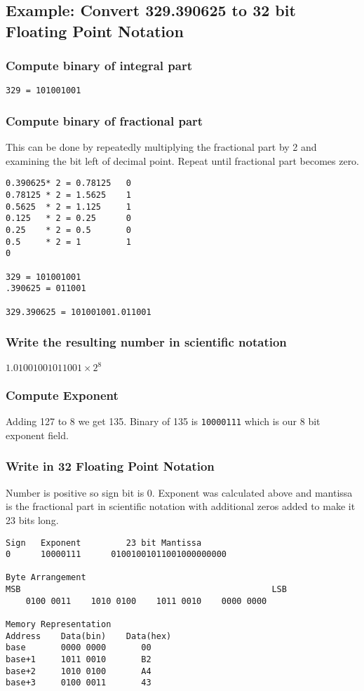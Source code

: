 \documentclass[12pt,a4paper]{article}
\begin{document}
\subsection{Example: Convert 329.390625 to 32 bit Floating Point Notation}
\subsubsection{Compute binary of integral part}
\verb|329 = 101001001|
\subsubsection{Compute binary of fractional part}
This can be done by repeatedly multiplying the fractional part by 2 and examining the bit left of decimal point. Repeat until fractional part becomes zero.
\begin{verbatim}
0.390625* 2 = 0.78125   0
0.78125 * 2 = 1.5625    1
0.5625  * 2 = 1.125     1
0.125   * 2 = 0.25      0
0.25    * 2 = 0.5       0
0.5     * 2 = 1         1
0

329 = 101001001
.390625 = 011001

329.390625 = 101001001.011001
\end{verbatim}
\subsubsection{Write the resulting number in scientific notation}
$1.01001001011001 \times 2^8$
\subsubsection{Compute Exponent}
Adding 127 to 8 we get 135. Binary of 135 is \verb|10000111| which is our 8 bit exponent field.
\subsubsection{Write in 32 Floating Point Notation}
Number is positive so sign bit is 0. Exponent was calculated above and mantissa is the fractional part in scientific notation with additional zeros added to make it 23 bits long.
\begin{verbatim}
Sign   Exponent         23 bit Mantissa
0      10000111      01001001011001000000000

Byte Arrangement
MSB                                                  LSB
    0100 0011    1010 0100    1011 0010    0000 0000

Memory Representation
Address    Data(bin)    Data(hex)
base       0000 0000       00
base+1     1011 0010       B2
base+2     1010 0100       A4
base+3     0100 0011       43
\end{verbatim}
\end{document}
